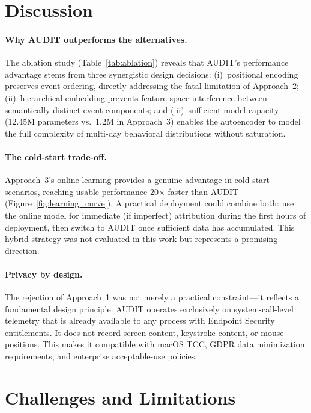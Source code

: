 \documentclass[letterpaper,twocolumn,10pt]{article}
\begin{document}
\section{Discussion}
\label{sec:discussion}

\paragraph{Why AUDIT outperforms the alternatives.}
The ablation study (Table~\ref{tab:ablation}) reveals that AUDIT's
performance advantage stems from three synergistic design
decisions: (i)~positional encoding preserves event ordering,
directly addressing the fatal limitation of Approach~2;
(ii)~hierarchical embedding prevents feature-space interference
between semantically distinct event components; and
(iii)~sufficient model capacity (12.45M parameters vs.\ 1.2M in
Approach~3) enables the autoencoder to model the full complexity of
multi-day behavioral distributions without saturation.

\paragraph{The cold-start trade-off.}
Approach~3's online learning provides a genuine advantage in
cold-start scenarios, reaching usable performance 20$\times$ faster
than AUDIT (Figure~\ref{fig:learning_curve}).  A practical
deployment could combine both: use the online model for immediate
(if imperfect) attribution during the first hours of deployment,
then switch to AUDIT once sufficient data has accumulated.  This
hybrid strategy was not evaluated in this work but represents a
promising direction.

\paragraph{Privacy by design.}
The rejection of Approach~1 was not merely a practical
constraint---it reflects a fundamental design principle.  AUDIT
operates exclusively on system-call-level telemetry that is already
available to any process with Endpoint Security entitlements.  It
does not record screen content, keystroke content, or mouse
positions.  This makes it compatible with macOS TCC, GDPR data
minimization requirements, and enterprise acceptable-use policies.



\section{Challenges and Limitations}
\label{sec:challenges}
\end{document}
